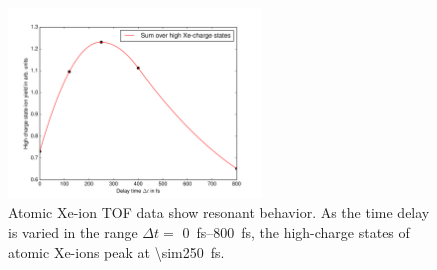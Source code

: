 \begin{figure}
	\centering
	\includegraphics[width=0.6\textwidth]{images/results/atomic-charge-state-time-resolved.png}
	\caption[Time-dependent response of atomic xenon in TOF spectroscopy.]{Atomic Xe-ion TOF data show resonant behavior. As the time delay is varied in the range $\Delta t=$ \SIrange{0}{800}{\femto\second}, the high-charge states of atomic Xe-ions peak at \SI{\sim250}{\femto\second}.}
	\label{fig:TOF-atomic-xenon-time-dependent}
\end{figure}
%
%
%
